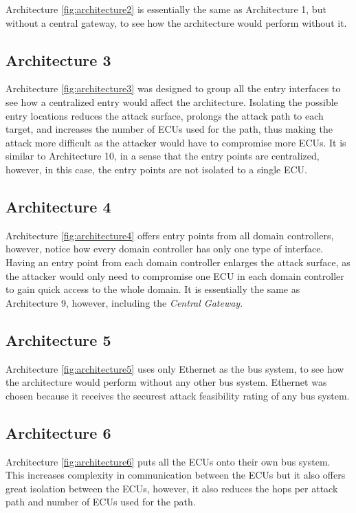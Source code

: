 Architecture \ref{fig:architecture2} is essentially the same as Architecture 1, 
but without a central gateway, to see how the architecture would perform without it.

\subsection{Architecture 3}
\label{subsec:arch3}

Architecture \ref{fig:architecture3} was designed to group all the entry interfaces to see how a centralized entry would affect the architecture. 
Isolating the possible entry locations reduces the attack surface, prolongs the attack path to each target, 
and increases the number of ECUs used for the path, thus making the attack more difficult as the attacker would have to compromise more ECUs. 
It is similar to Architecture 10, in a sense that the entry points are centralized, however, in this case, the entry points are not isolated to a single ECU.

\subsection{Architecture 4}
\label{subsec:arch4}

Architecture \ref{fig:architecture4} offers entry points from all domain controllers, 
however, notice how every domain controller has only one type of interface. 
Having an entry point from each domain controller enlarges the attack surface, 
as the attacker would only need to compromise one ECU in each domain controller to gain quick access to the whole domain. 
It is essentially the same as Architecture 9, however, including the \textit{Central Gateway}.

\subsection{Architecture 5}
\label{subsec:arch5}

Architecture \ref{fig:architecture5} uses only Ethernet as the bus system, 
to see how the architecture would perform without any other bus system. 
Ethernet was chosen because it receives the securest attack feasibility rating of any bus system.

\subsection{Architecture 6}
\label{subsec:arch6}

Architecture \ref{fig:architecture6} puts all the ECUs onto their own bus system. 
This increases complexity in communication between the ECUs but it also offers great isolation between the ECUs, 
however, it also reduces the hops per attack path and number of ECUs used for the path.

